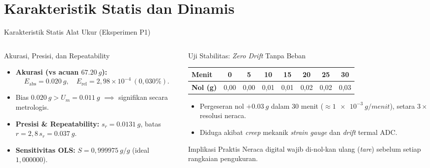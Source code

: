 \documentclass[aspectratio=169,10pt]{beamer}
\newcommand{\sm}{\fontsize{8.2}{10.2}\selectfont}
\newcommand{\xs}{\fontsize{7.1}{9}\selectfont}
\begin{document}
\section{Karakteristik Statis dan Dinamis}

\begin{frame}{Karakteristik Statis Alat Ukur (Eksperimen P1)}
\begin{columns}[T,onlytextwidth]
\begin{column}{.49\textwidth}
\begin{block}{Akurasi, Presisi, dan Repeatability}\sm
\begin{itemize}
\item \textbf{Akurasi (vs acuan $\SI{67,20}{g}$):}
  $$E_{\mathrm{abs}} = \SI{0,020}{g}, \quad E_{\mathrm{rel}} = 2{,}98\times 10^{-4}\ (0{,}030\%).$$
\item Bias $\SI{0,020}{g} > U_m = \SI{0,011}{g}$ $\implies$ signifikan secara metrologis.
\item \textbf{Presisi \& Repeatability:} $s_r = \SI{0,0131}{g}$, batas $r = 2{,}8\,s_r = \SI{0,037}{g}$.
\item \textbf{Sensitivitas OLS:} $S = 0{,}999975\ \si{g/g}$ (ideal $1{,}000000$).
\end{itemize}
\end{block}
\end{column}

\begin{column}{.49\textwidth}
\begin{exampleblock}{Uji Stabilitas: \textit{Zero Drift} Tanpa Beban}\sm
\centering
\setlength{\tabcolsep}{3.5pt}\begin{tabular}{@{}lccccccc@{}}
\toprule
\textbf{Menit} & 0 & 5 & 10 & 15 & 20 & 25 & 30\\
\midrule
\textbf{Nol (g)} & 0,00 & 0,00 & 0,01 & 0,01 & 0,02 & 0,02 & 0,03\\
\bottomrule
\end{tabular}
\par\vspace{2mm}\raggedright
\begin{itemize}
\item Pergeseran nol $+\SI{0,03}{g}$ dalam $30$ menit ($\approx \SI{1e-3}{g/menit}$), setara $3\times$ resolusi neraca.
\item Diduga akibat \textit{creep} mekanik \textit{strain gauge} dan \textit{drift} termal ADC.
\end{itemize}
\end{exampleblock}
\begin{alertblock}{Implikasi Praktis}\xs
Neraca digital wajib di-nol-kan ulang (\textit{tare}) sebelum setiap rangkaian pengukuran.
\end{alertblock}
\end{column}
\end{columns}
\end{frame}
\end{document}
